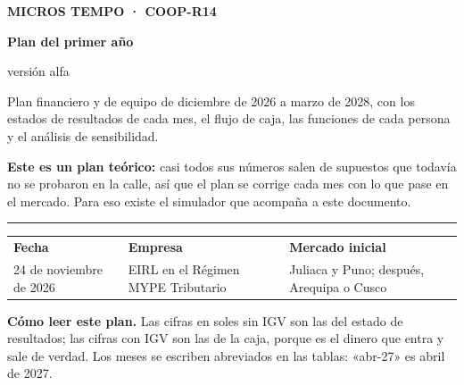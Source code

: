 \documentclass[10.5pt,a4paper]{article}
\begin{document}
\begin{titlepage}
\thispagestyle{empty}
\vspace*{1.2cm}
{\small\bfseries\color{marca}\MakeUppercase{Micros Tempo · COOP-R14}}\par\vspace{14pt}
{\fontsize{34}{38}\selectfont\bfseries Plan del primer año}\par\vspace{6pt}
{\fontsize{20}{24}\selectfont\color{tinta2} versión alfa}\par\vspace{18pt}
\begin{minipage}{0.82\linewidth}\large\color{tinta2}
Plan financiero y de equipo de diciembre de 2026 a marzo de 2028, con los estados de resultados de cada mes, el flujo de caja, las funciones de cada persona y el análisis de sensibilidad.
\end{minipage}

\vfill
\begin{aviso}
\textbf{Este es un plan teórico:} casi todos sus números salen de supuestos que todavía no se probaron en la calle, así que el plan se corrige cada mes con lo que pase en el mercado. Para eso existe el simulador que acompaña a este documento.
\end{aviso}
\vspace{10pt}
{\color{linea}\rule{\linewidth}{0.8pt}}\par\vspace{4pt}
\begin{tabularx}{\linewidth}{@{}XXX@{}}
{\footnotesize\bfseries Fecha} & {\footnotesize\bfseries Empresa} & {\footnotesize\bfseries Mercado inicial}\\
{\footnotesize\color{tinta2}24 de noviembre de 2026} & {\footnotesize\color{tinta2}EIRL en el Régimen MYPE Tributario} & {\footnotesize\color{tinta2}Juliaca y Puno; después, Arequipa o Cusco}
\end{tabularx}
\end{titlepage}

{\setcounter{tocdepth}{1}\tableofcontents}
\vspace{12pt}
\begin{nota}
\textbf{Cómo leer este plan.} Las cifras en soles sin IGV son las del estado de resultados; las cifras con IGV son las de la caja, porque es el dinero que entra y sale de verdad. Los meses se escriben abreviados en las tablas: «abr-27» es abril de 2027.
\end{nota}
\newpage
\end{document}
